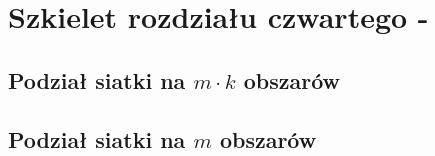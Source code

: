 \newpage


\section{Szkielet rozdziału czwartego - }


\newpage

\subsection{Podział siatki na $m \cdot k$ obszarów}

\newpage


\newpage

\newpage

\newpage

\newpage

\newpage



\newpage
\subsection{Podział siatki na $m$ obszarów}
